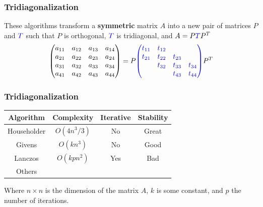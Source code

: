 \documentclass[serif, 12pt]{beamer}
\newcommand*\mat[1]{ \begin{pmatrix} #1 \end{pmatrix}}
\newcommand*\T{\textcolor{blue}{T}}
\begin{document}

\begin{frame}
%
\frametitle{Tridiagonalization}
%
These algorithms transform a \textbf{symmetric} matrix $A$ into a new pair of 
matrices $P$ and $\T$ such that $P$ is orthogonal, $\T$ is tridiagonal, and $A = 
P \T P^T$
%
$$
	\mat{
		a_{11} & a_{12} & a_{13} & a_{14} \\
		a_{21} & a_{22} & a_{23} & a_{24} \\
		a_{31} & a_{32} & a_{33} & a_{34} \\
		a_{41} & a_{42} & a_{43} & a_{44} \\
	} =
	P
	\textcolor{blue}{
	\mat{
		t_{11} & t_{12} &        &        \\
		t_{21} & t_{22} & t_{23} &        \\
		       & t_{32} & t_{33} & t_{34} \\
		       &        & t_{43} & t_{44} \\
	}}
	P^T
$$
%
\end{frame}


\begin{frame}
%
\frametitle{Tridiagonalization}
%
\begin{center}
\begin{tabular}{c c c c}
	\toprule
	Algorithm 		& Complexity  & Iterative & Stability\\
	\midrule
	Householder		& $O(4n^3/3)$ & No        & Great\\
	Givens				& $O(kn^3)$   & No        & Good \\
	Lanczos				& $O(kpn^2)$  & Yes       & Bad \\
	Others				&             &          \\
	\bottomrule
\end{tabular}
\end{center}
Where $n \times n$ is the dimension of the matrix $A$, $k$ is some constant, and 
$p$ the number of iterations.
\end{frame}

\end{document}
